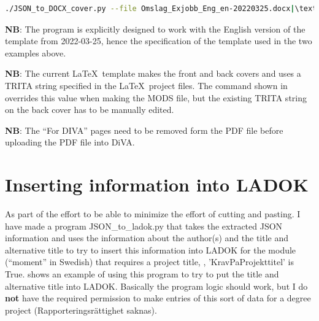 \begin{lstlisting}[escapechar=|, basicstyle=\footnotesize, language={bash}, caption={Command to make a cover DOCX file with the specified values}, label=lst:JSONtoDOCXcover2]
./JSON_to_DOCX_cover.py --file Omslag_Exjobb_Eng_en-20220325.docx|\textbackslash \\| --cycle 2 --credits 30.0 --area "bioteknik" --area2 "kemiteknik"|\textbackslash \\| --exam both --trita "TRITA-CBH-EX-2021:00"|\textbackslash \\| --language sv  --json calendar-sv.json
\end{lstlisting}

\textbf{NB}: The program is explicitly designed to work with the English version of the template from 2022-03-25, hence the specification of the template used in the two examples above.


\textbf{NB}: The current \LaTeX~template makes the front and back covers and uses a TRITA string specified in the \LaTeX~project files. The command shown in  overrides this value when making the MODS file, but the existing TRITA string on the back cover has to be manually edited.


\textbf{NB}: The ``For DIVA'' pages need to be removed form the PDF file before uploading the PDF file into DiVA.

\section[Inserting information into LADOK]{Inserting information into LADOK}
\label{sec:JSONtoLADOKDiVAAdmis}
As part of the effort to be able to minimize the effort of cutting and pasting. I have made a program JSON\_to\_ladok.py that takes the extracted JSON information and uses the information about the author(s) and the title and alternative title to try to insert this information into LADOK for the module (\ie ``moment'' in Swedish) that requires a project title, \ie, 'KravPaProjekttitel' is True.  shows an example of using this program to try to put the title and alternative title into LADOK. Basically the program logic should work, but I do \textbf{not} have the required permission to make entries of this sort of data for a degree project (\ie Rapporteringsrättighet saknas).

